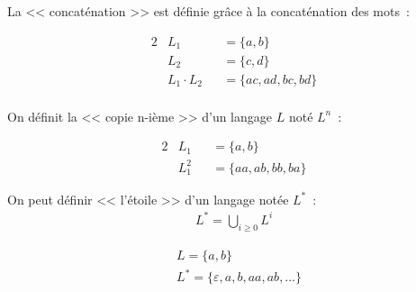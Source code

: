 \begin{frame}{\myframetitle}
  \begin{definition}[La concaténation]
    La << concaténation >> est définie grâce à la concaténation des mots~:

    \begin{alignat*}{2}
      &L_1 &&= \{a, b\} \\
      &L_2 &&= \{c, d\} \\
      &L_1 \cdot L_2 &&= \{ac, ad, bc, bd\} \\
    \end{alignat*}
  \end{definition}
\end{frame}

\begin{frame}{\myframetitle}
  \begin{definition}
    On définit la << copie n-ième >> d'un langage \(L\) noté \(L^n\)~:

    \begin{alignat*}{2}
      &L_1 &&= \{a, b\} \\
      &L_1^2 &&= \{aa, ab, bb, ba\}
    \end{alignat*}
  \end{definition}
\end{frame}

\begin{frame}{\myframetitle}
  \begin{definition}
    On peut définir << l'étoile >> d'un langage notée \(L^*\)~:
    \begin{align*}
      L^* = \bigcup_{i \geq 0} L^i
    \end{align*}
  \end{definition}

  \pause[]

  \begin{example}
    \vspace{-1.5\topsep}
    \begin{align*}
      &L = \{a, b\} \\
      &L^* = \{\varepsilon, a, b, aa, ab, \ldots\}
    \end{align*}
  \end{example}
\end{frame}

